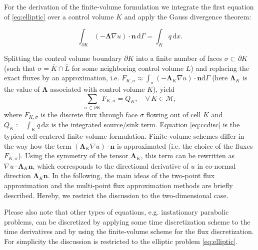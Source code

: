 For the derivation of the finite-volume formulation we integrate the first equation of \eqref{eq:elliptic} over a control volume $K$ and apply the Gauss divergence theorem:

\begin{equation}
    \int_{\partial K} \left( - \mathbf{\Lambda} \nabla u \right) \cdot \mathbf{n} \, \mathrm{d} \Gamma = \int_K q \, \mathrm{d}x.
    \label{eq:ellipticIntegrated}
\end{equation}

Splitting the control volume boundary $\partial K$ into a finite number of faces $\sigma \subset \partial K$ (such that $\sigma = \overline{K} \cap \overline{L}$ for some neighboring control volume $L$) and replacing the exact fluxes by an approximation, i.e. $F_{K, \sigma} \approx \int_{\sigma} \left( - \mathbf{\Lambda}_K \nabla u \right) \cdot \mathbf{n} \mathrm{d} \Gamma$ (here $\mathbf{\Lambda}_K$ is the value of $\mathbf{\Lambda}$ associated with control volume $K$), yield
\begin{equation}
    \sum_{\sigma \subset \partial K} F_{K, \sigma} = Q_K, \quad \forall \, {K \in \mathcal{M}},
\label{eq:ccdisc}
\end{equation}
where $F_{K, \sigma}$ is the discrete flux through face $\sigma$ flowing out of cell $K$ and $Q_K := \int_K q \, \mathrm{d}x$ is the integrated source/sink term. Equation \eqref{eq:ccdisc} is the typical cell-centered finite-volume formulation.
Finite-volume schemes differ in the way how the term
$(\mathbf{\Lambda}_K \nabla u ) \cdot \mathbf{n} $ is approximated (i.e. the choice of the fluxes $F_{K, \sigma}$). Using the symmetry of the tensor $\mathbf{\Lambda}_K$, this term can be rewritten as
$\nabla u  \cdot \mathbf{\Lambda}_K\mathbf{n}$, which corresponds to the directional derivative of $u$ in co-normal direction $\mathbf{\Lambda}_K\mathbf{n}$.
In the following, the main ideas of the two-point flux approximation and the multi-point flux approximation methods are briefly described. Hereby, we restrict the discussion to the two-dimensional case.

Please also note that other types of equations, e.g. instationary parabolic problems, can be discretized by applying some time discretization scheme to the time derivatives and by using the finite-volume scheme for the flux discretization. For simplicity the discussion is restricted to the elliptic problem \eqref{eq:elliptic}.

